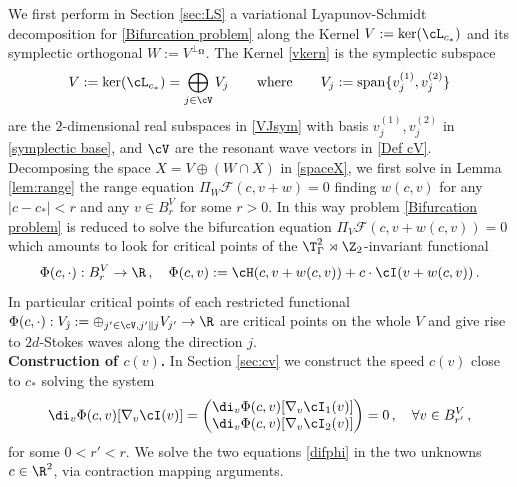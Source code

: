 \documentclass[11pt,a4paper,reqno]{article}
\numberwithin{equation}{section}
\theoremstyle{definition}
\begin{document}
We first perform in Section \ref{sec:LS}  a variational Lyapunov-Schmidt decomposition for  \eqref{Bifurcation problem} along the Kernel 
$ V := \ker(\cL_{c_*}) $ and  its symplectic orthogonal $ W := V^{\bot_{\boldsymbol{\Omega}}} $. The Kernel  \eqref{vkern} is the symplectic subspace  
$$
V := \ker(\cL_{c_*})  = 
\bigoplus_{j \in \cV} 
V_j \qquad \text{where}\qquad 
V_j := {\rm span}\{v_j^{(1)},v_j^{(2)} \} 
$$
are the $2$-dimensional real  subspaces in  \eqref{VJsym} with basis 
$ v_j^{(1)}, v_j^{(2)}$  in \eqref{symplectic base}, 
 and $ \cV $ are the resonant wave vectors
in \eqref{Def cV}. 
Decomposing the space 
$ X = V \oplus (W \cap X) $ 
in \eqref{spaceX}, 
we first solve in Lemma \ref{lem:range} the range equation  
$ \Pi_W {\mathcal F}(c, 
v + w) = 0 $ finding 
$ w(c,v) $ 
for any $ |c - c_* | < r $ and any  
$ v  \in B_r^V $ for some $ r > 0 $. In this way  problem \eqref{Bifurcation problem}  is reduced to solve the bifurcation equation 
$ \Pi_V {\mathcal F}(c, v + w(c,v)) = 0 $
which amounts to look for critical points of the $ \T^2_\Gamma \rtimes \Z_2 $-invariant %
functional  
$$ 
\Phi (c, \cdot ) : B_r^V \to \R \, , \quad 
\Phi (c, v) := 
\cH (c, v + w(c,v) ) +c\cdot \cI(v+w(c,v))\, .
$$ 
In particular 
critical points of each restricted functional  
$ \Phi (c, \cdot) : V_{\hat \jmath} := 
\oplus_{j' \in \cV, j' \parallel j} V_{j'} \to \R $ are critical points on the whole $ V $
 and  give rise to 
$ 2 d $-Stokes waves along 
the direction $j $. 
\\[1mm]
{\bf Construction of $ c(v) $.}
In  Section \ref{sec:cv} 
 we construct 
the speed $ c(v) $ close to $c_*$ solving 
the system 
\begin{equation}\label{difphi}
\di_v \Phi (c, v) [\nabla_v \cI (v)] = 
        \begin{pmatrix}
        \di_v \Phi (c, v) [\nabla_v \cI_1 (v)]   \\
        \di_v \Phi (c, v) [\nabla_v \cI_2 (v)] 
        \end{pmatrix} = 0 \, , \quad 
         \forall v \in B_{r'}^V 
\, ,
\end{equation}
for some $ 0 < r' < r $. 
We solve the two equations \eqref{difphi}  in the two unknowns $ c \in \R^2 $,  via   contraction mapping arguments. 
\end{document}
